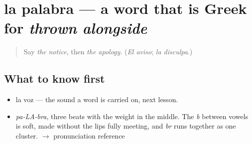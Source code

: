 \section[la palabra]{la palabra — a word that is Greek for \emph{thrown alongside}}

\label{lesson:ES-C332-palabra}



\begin{quote}
Say \emph{the notice}, then \emph{the apology}. (\emph{El aviso}; \emph{la disculpa}.)
\end{quote}

\subsection*{What to know first}
\begin{itemize}
\raggedright
  \item la voz — the sound a word is carried on, next lesson.
\end{itemize}

\begin{sounds}
\begin{itemize}
\raggedright
  \item \emph{pa-LA-bra}, three beats with the weight in the middle. The \emph{b} between vowels is soft, made without the lips fully meeting, and \emph{br} runs together as one cluster. $\to$ pronunciation reference
\end{itemize}
\end{sounds}

